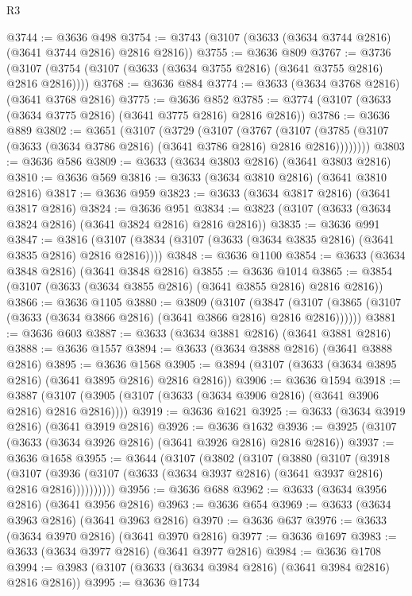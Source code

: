 \begin{lexlean}{R3}
\begin{coremodule}
@3744 := @3636 @498
@3754 := @3743 (@3107 (@3633 (@3634 @3744 @2816) (@3641 @3744 @2816) @2816 @2816))
@3755 := @3636 @809
@3767 := @3736 (@3107 (@3754 (@3107 (@3633 (@3634 @3755 @2816) (@3641 @3755 @2816) @2816 @2816))))
@3768 := @3636 @884
@3774 := @3633 (@3634 @3768 @2816) (@3641 @3768 @2816)
@3775 := @3636 @852
@3785 := @3774 (@3107 (@3633 (@3634 @3775 @2816) (@3641 @3775 @2816) @2816 @2816))
@3786 := @3636 @889
@3802 := @3651
    (@3107
      (@3729
        (@3107
          (@3767
            (@3107 (@3785 (@3107 (@3633 (@3634 @3786 @2816) (@3641 @3786 @2816) @2816 @2816))))))))
@3803 := @3636 @586
@3809 := @3633 (@3634 @3803 @2816) (@3641 @3803 @2816)
@3810 := @3636 @569
@3816 := @3633 (@3634 @3810 @2816) (@3641 @3810 @2816)
@3817 := @3636 @959
@3823 := @3633 (@3634 @3817 @2816) (@3641 @3817 @2816)
@3824 := @3636 @951
@3834 := @3823 (@3107 (@3633 (@3634 @3824 @2816) (@3641 @3824 @2816) @2816 @2816))
@3835 := @3636 @991
@3847 := @3816 (@3107 (@3834 (@3107 (@3633 (@3634 @3835 @2816) (@3641 @3835 @2816) @2816 @2816))))
@3848 := @3636 @1100
@3854 := @3633 (@3634 @3848 @2816) (@3641 @3848 @2816)
@3855 := @3636 @1014
@3865 := @3854 (@3107 (@3633 (@3634 @3855 @2816) (@3641 @3855 @2816) @2816 @2816))
@3866 := @3636 @1105
@3880 := @3809
    (@3107
      (@3847 (@3107 (@3865 (@3107 (@3633 (@3634 @3866 @2816) (@3641 @3866 @2816) @2816 @2816))))))
@3881 := @3636 @603
@3887 := @3633 (@3634 @3881 @2816) (@3641 @3881 @2816)
@3888 := @3636 @1557
@3894 := @3633 (@3634 @3888 @2816) (@3641 @3888 @2816)
@3895 := @3636 @1568
@3905 := @3894 (@3107 (@3633 (@3634 @3895 @2816) (@3641 @3895 @2816) @2816 @2816))
@3906 := @3636 @1594
@3918 := @3887 (@3107 (@3905 (@3107 (@3633 (@3634 @3906 @2816) (@3641 @3906 @2816) @2816 @2816))))
@3919 := @3636 @1621
@3925 := @3633 (@3634 @3919 @2816) (@3641 @3919 @2816)
@3926 := @3636 @1632
@3936 := @3925 (@3107 (@3633 (@3634 @3926 @2816) (@3641 @3926 @2816) @2816 @2816))
@3937 := @3636 @1658
@3955 := @3644
    (@3107
      (@3802
        (@3107
          (@3880
            (@3107
              (@3918
                (@3107
                  (@3936 (@3107 (@3633 (@3634 @3937 @2816) (@3641 @3937 @2816) @2816 @2816))))))))))
@3956 := @3636 @688
@3962 := @3633 (@3634 @3956 @2816) (@3641 @3956 @2816)
@3963 := @3636 @654
@3969 := @3633 (@3634 @3963 @2816) (@3641 @3963 @2816)
@3970 := @3636 @637
@3976 := @3633 (@3634 @3970 @2816) (@3641 @3970 @2816)
@3977 := @3636 @1697
@3983 := @3633 (@3634 @3977 @2816) (@3641 @3977 @2816)
@3984 := @3636 @1708
@3994 := @3983 (@3107 (@3633 (@3634 @3984 @2816) (@3641 @3984 @2816) @2816 @2816))
@3995 := @3636 @1734

\end{coremodule}
\end{lexlean}
